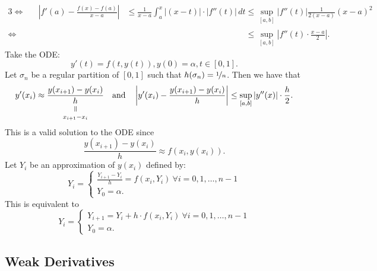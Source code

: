 \documentclass{article}
\newcommand{\verteq}{\rotatebox{90}{$\,=$}}
\newcommand{\equalto}[2]{\underset{\scriptstyle\overset{\mkern4mu\verteq}{#2}}{#1}}
\newcommand{\?}{\stackrel{?}{=}}
\theoremstyle{definition} %
\begin{document}
\begin{itemize}
\begin{alignat*}{3}
        \iff&& \left|f'(a) - \frac{f(x) - f(a)}{x - a}\right| &\leq \frac{1}{x - a}\int_a^x |(x - t)| \cdot |f''(t)| \,dt \leq \sup_{[a, b]}\left|f''(t)\right| \frac{1}{2(x - a)}(x - a)^2 \\
        \iff&&\phantom{\left|f'(a) - \frac{f(x) - f(a)}{x - a}\right|} & \phantom{{} \leq \frac{1}{x - a}\int_a^x |(x - t)| \cdot |f''(t)| \,dt} \leq \sup_{[a, b]} \left|f''(t) \cdot \frac{x - a}{2}\right|.
    \end{alignat*}
    Take the ODE:
    $$y'(t) = f(t, y(t)), y(0) = \alpha, t \in [0, 1].$$
    Let $\sigma_n$ be a regular partition of $[0, 1]$ such that $h(\sigma_n) = \nicefrac{1}{n}$. Then we have that
    $$y'(x_i) \approx \frac{y(x_{i + 1}) - y(x_i)}{\equalto{h}{x_{i + 1} - x_i}} \quad \text{and} \quad \left|y'(x_i) - \frac{y(x_{i + 1}) - y(x_i)}{h}\right| \leq \sup_{[a, b]} \left|y''(x)\right| \cdot \frac{h}{2}.$$
    This is a valid solution to the ODE since
    $$\frac{y(x_{i + 1}) - y(x_i)}{h} \approx f(x_i, y(x_i)).$$
    Let $Y_i$ be an approximation of $y(x_i)$ defined by:
    \[
    Y_i =
    \begin{cases}
        \frac{Y_{i + 1} - Y_i}{h} = f(x_i, Y_i) \ \forall i = 0, 1, \ldots, n - 1 \\
        Y_0 = \alpha.
    \end{cases}
    \]
    This is equivalent to
    \[
    Y_i =
    \begin{cases}
        Y_{i + 1} = Y_i + h \cdot f(x_i, Y_i) \ \forall i = 0, 1, \ldots, n - 1 \\
        Y_0 = \alpha.
    \end{cases}
    \]
\end{itemize}

\subsection{Weak Derivatives}
\end{document}
